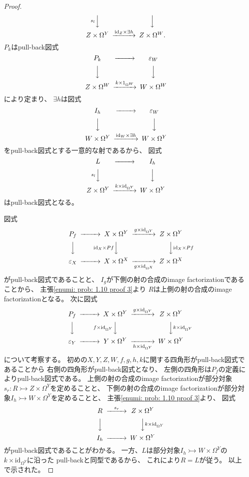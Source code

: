 \documentclass[uplatex]{jsarticle}
\theoremstyle{definition}
\def\ep{\varepsilon}
\def\id{\mathrm{id}}
\newcommand{\rtot}{\rightarrowtail}
\begin{document}
\begin{proof}
\[\begin{CD}
    @V s_l VV @VVV \\
    Z\times \Omega^Y @> \id_Z \times \exists h >> Z\times \Omega^W.
  \end{CD}
  \]
  \(P_k\)はpull-back図式
  \[
  \begin{CD}
    P_k @>>> \ep_W \\
    @VVV @VVV \\
    Z\times \Omega^W @> k\times 1_{\Omega^W} >> W\times \Omega^W
  \end{CD}
  \]
  により定まり、
  \(\exists h\)は図式
  \[
  \begin{CD}
    I_h @>>> \ep_W \\
    @VVV @VVV \\
    W\times \Omega^Y @> \id_W \times \exists h >> W\times \Omega^Y
  \end{CD}
  \]
  をpull-back図式とする一意的な射であるから、
  図式
  \[
  \begin{CD}
    L @>>> I_h \\
    @V s_l VV @VVV \\
    Z\times \Omega^Y @> k \times \id_{\Omega^Y} >> W\times \Omega^Y
  \end{CD}
  \]
  はpull-back図式となる。

  図式
  \[
  \begin{CD}
    P_f @>>> X\times \Omega^Y @> g\times \id_{\Omega^Y} >> Z\times \Omega^Y \\
    @VVV @V \id_X \times Pf VV @VV \id_X \times Pf V \\
    \ep_X @>>> X\times \Omega^X @>> g \times \id_{\Omega^X}> Z\times \Omega^X
  \end{CD}
  \]
  がpull-back図式であることと、
  \(I_g\)が下側の射の合成のimage factorizationであることから、
  主張\ref{enumi: prob: 1.10 proof 3}より
  \(R\)は上側の射の合成のimage factorizationとなる。
  次に図式
  \[
  \begin{CD}
    P_f @>>> X\times \Omega^Y @> g\times \id_{\Omega^Y} >> Z\times \Omega^Y \\
    @VVV @V f\times \id_{\Omega^Y} VV @VV k \times \id_{\Omega^Y} V \\
    \ep_Y @>>> Y\times \Omega^Y @>> h \times \id_{\Omega^Y}> W\times \Omega^Y
  \end{CD}
  \]
  について考察する。
  初めの\(X,Y,Z,W,f,g,h,k\)に関する四角形がpull-back図式であることから
  右側の四角形がpull-back図式となり、
  左側の四角形は\(P_f\)の定義によりpull-back図式である。
  上側の射の合成のimage factorizationが部分対象\(s_r:R\rtot Z\times \Omega^Y\)を定めることと、
  下側の射の合成のimage factorizationが部分対象\(I_h \rtot W\times \Omega^Y\)を定めることと、
  主張\ref{enumi: prob: 1.10 proof 3}より、
  図式
  \[
  \begin{CD}
    R @> s_r >> Z\times \Omega^Y \\
    @VVV @VV k\times \id_{\Omega^Y} V \\
    I_h @>>> W\times \Omega^Y
  \end{CD}
  \]
  がpull-back図式であることがわかる。
  一方、\(L\)は部分対象\(I_h\rtot W\times \Omega^Y\)の\(k\times \id_{\Omega^Y}\)に沿った
  pull-backと同型であるから、
  これにより\(R=L\)が従う。
  以上で示された。


\end{proof}
\end{document}
